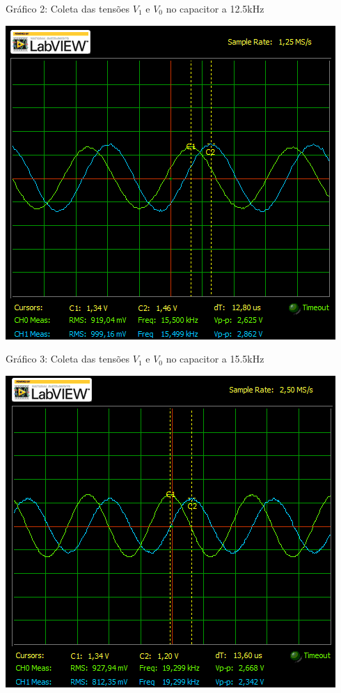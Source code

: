 \documentclass[a4 paper]{article}
\begin{document}
\begin{center}
Gráfico 2: Coleta das tensões $V_1$ e $V_0$ no capacitor a 12.5kHz
\end{center}

\newpage
\begin{table}[h]
\centering
\includegraphics[scale=0.7]{graficos/circ1/rgadicoa1-2-15_5}
\end{table}

\begin{center}
Gráfico 3: Coleta das tensões $V_1$ e $V_0$ no capacitor a 15.5kHz
\end{center}


\begin{table}[h]
\centering
\includegraphics[scale=0.7]{graficos/circ1/rgadicoa1-2-19_3}
\end{table}
\end{document}
